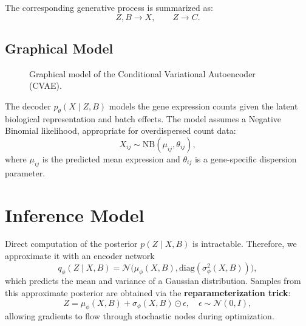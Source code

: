 \documentclass[11pt,a4paper]{article}
\begin{document}
The corresponding generative process is summarized as:
\[
Z, B \rightarrow X, \qquad Z \rightarrow C.
\]

\subsection*{Graphical Model}

\begin{figure}[h!]
\centering
{}
\caption{Graphical model of the Conditional Variational Autoencoder (CVAE).}
\end{figure}

The decoder $p_\theta(X \mid Z, B)$ models the gene expression counts given the latent biological representation and batch effects. The model assumes a Negative Binomial likelihood, appropriate for overdispersed count data:
\[
X_{ij} \sim \mathrm{NB}(\mu_{ij}, \theta_{ij}),
\]
where $\mu_{ij}$ is the predicted mean expression and $\theta_{ij}$ is a gene-specific dispersion parameter.

\section{Inference Model}

Direct computation of the posterior $p(Z \mid X, B)$ is intractable. Therefore, we approximate it with an encoder network
\[
q_\phi(Z \mid X, B) = \mathcal{N}\!\big(\mu_\phi(X, B), \mathrm{diag}(\sigma_\phi^2(X, B))\big),
\]
which predicts the mean and variance of a Gaussian distribution. Samples from this approximate posterior are obtained via the \textbf{reparameterization trick}:
\[
Z = \mu_\phi(X, B) + \sigma_\phi(X, B) \odot \epsilon, \quad \epsilon \sim \mathcal{N}(0, I),
\]
allowing gradients to flow through stochastic nodes during optimization.
\end{document}
